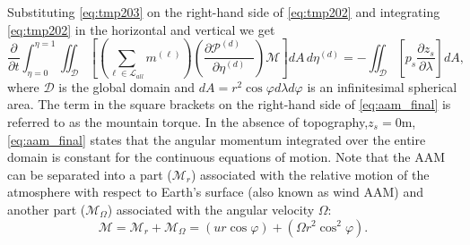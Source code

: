 \documentclass{agujournal}
\begin{document}
Substituting \eqref{eq:tmp203} on the right-hand side of \eqref{eq:tmp202} and integrating \eqref{eq:tmp202} in the horizontal and vertical we get
\begin{equation}
\frac{\partial}{\partial t}\int_{\eta=0}^{\eta=1}\iint_{\mathcal{D}}\left[ \left( \sum_{\ell \in \mathcal{L}_{all}} m^{(\ell)}\right) \left( \frac{\partial \mathcal{P}^{(d)}\quad }{\partial \eta^{(d)}} \right) \mathcal{M} \right] dA\, d\eta^{(d)}=-\iint_{\mathcal{D}}\left[ p_s \frac{\partial z_s}{\partial \lambda}\right] dA,\label{eq:aam_final}
\end{equation}
where $\mathcal{D}$ is the global domain and $dA=r^2\cos\varphi d\lambda d\varphi$ is an infinitesimal spherical area. The term in the square brackets on the right-hand side of \eqref{eq:aam_final} is referred to as the mountain torque. In the absence of topography,$z_s=0$m, \eqref{eq:aam_final} states that the angular momentum integrated over the entire domain is constant for the continuous equations of motion. Note that the AAM can be separated into a part ($\mathcal{M}_r$) associated with the relative motion of the atmosphere with respect to Earth's surface (also known as wind AAM) and another part ($\mathcal{M}_{\Omega}$) associated with the angular velocity $\Omega$:
\begin{equation}
\mathcal{M}=\mathcal{M}_r+\mathcal{M}_\Omega=\left( u r \cos \varphi\right)+\left(\Omega r^2 \cos^2 \varphi \right) .
\end{equation}
\end{document}
